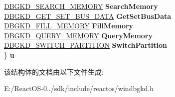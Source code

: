 \begin{DoxyCompactItemize}
\begin{tabbing}
\>\hyperlink{struct___d_b_g_k_d___s_e_a_r_c_h___m_e_m_o_r_y}{DBGKD\_SEARCH\_MEMORY} {\bfseries SearchMemory}\\
\>\hyperlink{struct___d_b_g_k_d___g_e_t___s_e_t___b_u_s___d_a_t_a}{DBGKD\_GET\_SET\_BUS\_DATA} {\bfseries GetSetBusData}\\
\>\hyperlink{struct___d_b_g_k_d___f_i_l_l___m_e_m_o_r_y}{DBGKD\_FILL\_MEMORY} {\bfseries FillMemory}\\
\>\hyperlink{struct___d_b_g_k_d___q_u_e_r_y___m_e_m_o_r_y}{DBGKD\_QUERY\_MEMORY} {\bfseries QueryMemory}\\
\>\hyperlink{struct___d_b_g_k_d___s_w_i_t_c_h___p_a_r_t_i_t_i_o_n}{DBGKD\_SWITCH\_PARTITION} {\bfseries SwitchPartition}\\
\} {\bfseries u}\\

\end{tabbing}\end{DoxyCompactItemize}


该结构体的文档由以下文件生成\+:\begin{DoxyCompactItemize}
\item 
E\+:/\+React\+O\+S-\/0../sdk/include/reactos/windbgkd.\+h\end{DoxyCompactItemize}
